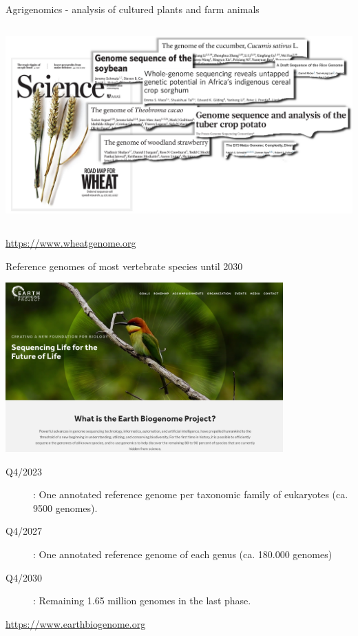 \documentclass[10pt]{beamer}
\begin{document}
\begin{frame}{Agrigenomics - analysis of cultured plants and farm animals}
	\begin{columns}
		\column{\dimexpr\paperwidth-10pt}
		\includegraphics[width=\textwidth]{./figures/agrigenomics2.png}\par
	\end{columns}
	\hfill \url{https://www.wheatgenome.org}
\end{frame}

\begin{frame}{Reference genomes of most vertebrate species until 2030}
	\begin{center}
		\includegraphics[width=0.8\textwidth]{./figures/earthbiomeproject.png} \\
	\end{center}
       \begin{description}
		\item [Q4/2023]: One annotated reference genome per taxonomic family of eukaryotes (ca. 9500 genomes).
		\item [Q4/2027]: One annotated reference genome of each genus (ca. 180.000 genomes) 
		\item [Q4/2030]: Remaining 1.65 million genomes in the last phase.
	\end{description}
	\url{https://www.earthbiogenome.org}
\end{frame}
\end{document}
